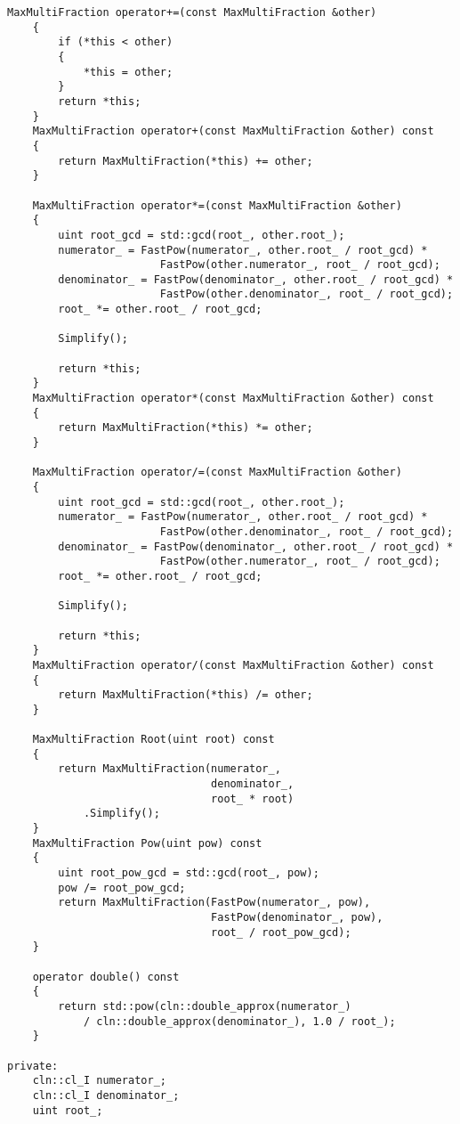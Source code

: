 \begin{lstlisting}[caption=fraction.h\label{listing:fraction}]
    MaxMultiFraction operator+=(const MaxMultiFraction &other)
    {
        if (*this < other)
        {
            *this = other;
        }
        return *this;
    }
    MaxMultiFraction operator+(const MaxMultiFraction &other) const
    {
        return MaxMultiFraction(*this) += other;
    }

    MaxMultiFraction operator*=(const MaxMultiFraction &other)
    {
        uint root_gcd = std::gcd(root_, other.root_);
        numerator_ = FastPow(numerator_, other.root_ / root_gcd) *
                        FastPow(other.numerator_, root_ / root_gcd);
        denominator_ = FastPow(denominator_, other.root_ / root_gcd) *
                        FastPow(other.denominator_, root_ / root_gcd);
        root_ *= other.root_ / root_gcd;

        Simplify();

        return *this;
    }
    MaxMultiFraction operator*(const MaxMultiFraction &other) const
    {
        return MaxMultiFraction(*this) *= other;
    }

    MaxMultiFraction operator/=(const MaxMultiFraction &other)
    {
        uint root_gcd = std::gcd(root_, other.root_);
        numerator_ = FastPow(numerator_, other.root_ / root_gcd) *
                        FastPow(other.denominator_, root_ / root_gcd);
        denominator_ = FastPow(denominator_, other.root_ / root_gcd) *
                        FastPow(other.numerator_, root_ / root_gcd);
        root_ *= other.root_ / root_gcd;

        Simplify();

        return *this;
    }
    MaxMultiFraction operator/(const MaxMultiFraction &other) const
    {
        return MaxMultiFraction(*this) /= other;
    }

    MaxMultiFraction Root(uint root) const
    {
        return MaxMultiFraction(numerator_,
                                denominator_,
                                root_ * root)
            .Simplify();
    }
    MaxMultiFraction Pow(uint pow) const
    {
        uint root_pow_gcd = std::gcd(root_, pow);
        pow /= root_pow_gcd;
        return MaxMultiFraction(FastPow(numerator_, pow),
                                FastPow(denominator_, pow),
                                root_ / root_pow_gcd);
    }

    operator double() const
    {
        return std::pow(cln::double_approx(numerator_)
            / cln::double_approx(denominator_), 1.0 / root_);
    }

private:
    cln::cl_I numerator_;
    cln::cl_I denominator_;
    uint root_;


\end{lstlisting}
